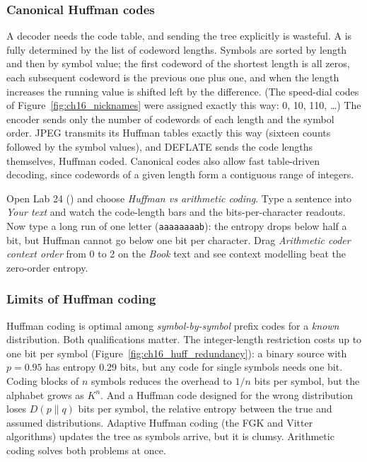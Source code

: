 \subsubsection{Canonical Huffman codes}

A decoder needs the code table, and sending the tree explicitly is wasteful. A  is fully determined by the list of codeword lengths. Symbols are sorted by length
and then by symbol value; the first codeword of the shortest length is all zeros, each subsequent
codeword is the previous one plus one, and when the length increases the running value is shifted
left by the difference. (The speed-dial codes of Figure~\ref{fig:ch16_nicknames} were assigned
exactly this way: 0, 10, 110, \dots) The encoder sends only the number of codewords of each length
and the symbol order. JPEG transmits its Huffman tables exactly this way (sixteen counts followed by
the symbol values), and DEFLATE sends the code lengths themselves, Huffman coded. Canonical codes
also allow fast table-driven decoding, since codewords of a given length form a contiguous range of
integers.

\begin{tryit}
Open Lab 24 () and choose \emph{Huffman vs arithmetic coding}. Type a
sentence into \emph{Your text} and watch the code-length bars and the bits-per-character readouts.
Now type a long run of one letter (\texttt{aaaaaaaab}): the entropy drops below half a bit, but
Huffman cannot go below one bit per character. Drag \emph{Arithmetic coder context order} from 0
to 2 on the \emph{Book} text and see context modelling beat the zero-order entropy.
\end{tryit}


\subsubsection{Limits of Huffman coding}

Huffman coding is optimal among \emph{symbol-by-symbol} prefix codes for a \emph{known}
distribution. Both qualifications matter. The integer-length restriction costs up to one bit per
symbol (Figure~\ref{fig:ch16_huff_redundancy}): a binary source with $p=0.95$ has entropy 0.29
bits, but any code for single symbols needs one bit. Coding blocks of $n$ symbols reduces the
overhead to $1/n$ bits per symbol, but the alphabet grows as $K^n$. And a Huffman code designed for
the wrong distribution loses $D(p\|q)$ bits per symbol, the relative entropy between the true and
assumed distributions. Adaptive Huffman coding (the FGK and Vitter algorithms) updates the tree as
symbols arrive, but it is clumsy. Arithmetic coding solves both problems at once.

